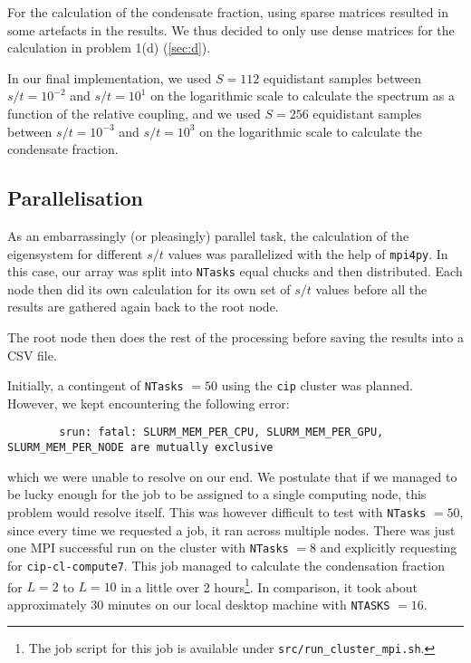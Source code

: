         For the calculation of the condensate fraction, using sparse matrices resulted in some artefacts in the results. We thus decided to only use dense matrices for the calculation in problem 1(d) (\autoref{sec:d}). 

        In our final implementation, we used $S = 112$ equidistant samples between $s/t = 10^{-2}$ and $s/t = 10^{1}$ on the logarithmic scale to calculate the spectrum as a function of the relative coupling, and we used $S = 256$ equidistant samples between $s/t = 10^{-3}$ and $s/t = 10^{3}$ on the logarithmic scale to calculate the condensate fraction. 

    \subsection{Parallelisation}
        \label{sec:parallelisation}
        As an embarrassingly (or pleasingly) parallel task, the calculation of the eigensystem for different $s/t$ values was parallelized with the help of \texttt{mpi4py}. In this case, our  array was split into \texttt{NTasks} equal chucks and then distributed. Each node then did its own calculation for its own set of $s/t$ values before all the results are gathered again back to the root node. 

        The root node then does the rest of the processing before saving the results into a CSV file. 

        Initially, a contingent of \texttt{NTasks} $ = 50$ using the \texttt{cip} cluster was planned. However, we kept encountering the following error:
        \begin{verbatim}
        srun: fatal: SLURM_MEM_PER_CPU, SLURM_MEM_PER_GPU, SLURM_MEM_PER_NODE are mutually exclusive
        \end{verbatim}
        which we were unable to resolve on our end. We postulate that if we managed to be lucky enough for the job to be assigned to a single computing node, this problem would resolve itself. This was however difficult to test with \texttt{NTasks} $ = 50$, since every time we requested a job, it ran across multiple nodes. There was just one MPI successful run on the cluster with \texttt{NTasks} $ = 8$ and explicitly requesting for \texttt{cip-cl-compute7}. This job managed to calculate the condensation fraction for $L = 2$ to $L = 10$ in a little over 2 hours\footnote{The job script for this job is available under \texttt{src/run\_cluster\_mpi.sh}.}. In comparison, it took about approximately 30 minutes on our local desktop machine with \texttt{NTASKS} $= 16$.
        
